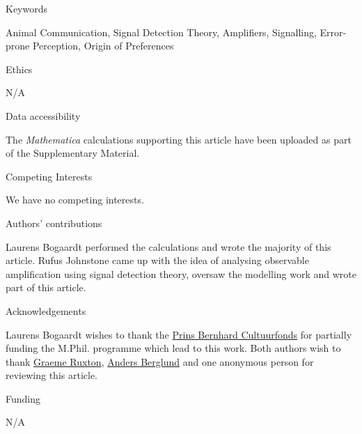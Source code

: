 \documentclass[a4paper,12pt]{article}
\numberwithin{equation}{section}
\numberwithin{figure}{section}
\begin{document}
\begin{bf}
Keywords
\end{bf}
\newline
Animal Communication, Signal Detection Theory, Amplifiers, Signalling, Error-prone Perception, Origin of Preferences

\begin{bf}
Ethics
\end{bf}
\newline
N/A

\begin{bf}
Data accessibility
\end{bf}
\newline
The \textit{Mathematica} calculations supporting this article have been uploaded as part of the Supplementary Material.

\begin{bf}
Competing Interests
\end{bf}
\newline
We have no competing interests.

\begin{bf}
Authors' contributions
\end{bf}
\newline
Laurens Bogaardt performed the calculations and wrote the majority of this article. Rufus Johnstone came up with the idea of analysing observable amplification using signal detection theory, oversaw the modelling work and wrote part of this article.

\begin{bf}
Acknowledgements
\end{bf}
\newline
Laurens Bogaardt wishes to thank the \href{http://www.cultuurfonds.nl}{Prins Bernhard Cultuurfonds} for partially funding the M.Phil. programme which lead to this work. Both authors wish to thank \href{http://biology.st-andrews.ac.uk/contact/staffProfile.aspx?sunID=gr41}{Graeme Ruxton}, \href{http://katalog.uu.se/profile/?id=XX2653}{Anders Berglund} and one anonymous person for reviewing this article.

\begin{bf}
Funding
\end{bf}
\newline
N/A

\newpage


\label{sec:Contents}
\renewcommand{\contentsname}{Contents\\} 
\end{document}
